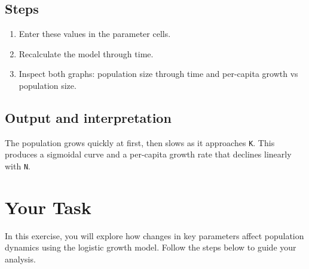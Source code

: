 \documentclass[
  a4paper]{book}
\providecommand{\tightlist}{%
  \setlength{\itemsep}{0pt}\setlength{\parskip}{0pt}}
\begin{document}
\subsection{Steps}\label{steps-4}

\begin{enumerate}
\def\labelenumi{\arabic{enumi}.}
\tightlist
\item
  Enter these values in the parameter cells.
\item
  Recalculate the model through time.
\item
  Inspect both graphs: population size through time and per-capita growth vs population size.
\end{enumerate}

\subsection{Output and interpretation}\label{output-and-interpretation-4}

The population grows quickly at first, then slows as it approaches \texttt{K}. This produces a sigmoidal curve and a per-capita growth rate that declines linearly with \texttt{N}.

\section{Your Task}\label{your-task-5}

In this exercise, you will explore how changes in key parameters affect population dynamics using the logistic growth model. Follow the steps below to guide your analysis.
\end{document}
